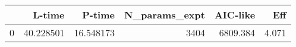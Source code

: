 \begin{tabular}{lrrrrr}
\toprule
{} &     L-time &     P-time &  N\_params\_expt &  AIC-like &    Eff \\
\midrule
0 &  40.228501 &  16.548173 &           3404 &  6809.384 &  4.071 \\
\bottomrule
\end{tabular}
